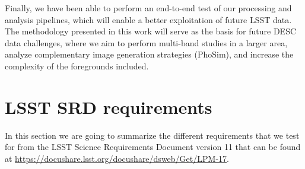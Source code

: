 \documentclass[\docopts]{\docclass}
\begin{document}
Finally, we have been able to perform an end-to-end test of our processing and analysis pipelines, which will enable a better exploitation of future LSST data. The methodology presented in this work will serve as the basis for future DESC data challenges, where we aim to perform multi-band studies in a larger area, analyze complementary image generation strategies (PhoSim), and increase the complexity of the foregrounds included.

\appendix



\section{LSST SRD requirements}
\label{app:lsst_srd}
In this section we are going to summarize the different requirements that we test for from the LSST Science Requirements Document version 11 that can be found at \url{https://docushare.lsst.org/docushare/dsweb/Get/LPM-17}.

\end{document}
